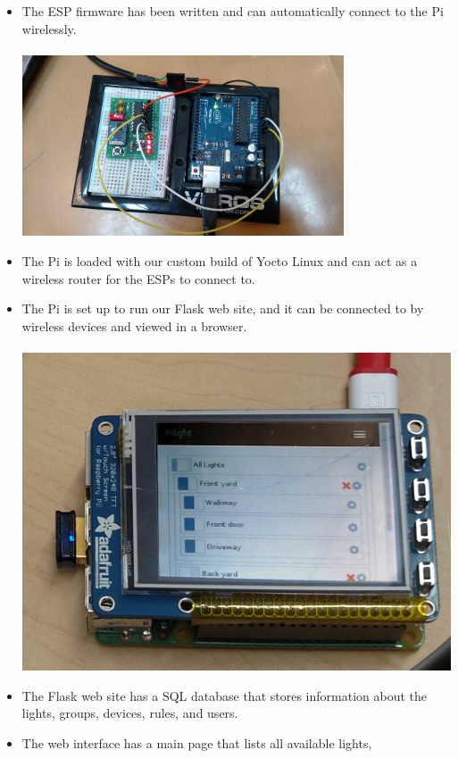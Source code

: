 \documentclass[10pt,draftclsnofoot,onecolumn]{IEEEtran}
\begin{document}
\begin{itemize}
    \item The ESP firmware has been written and can automatically connect to
        the Pi wirelessly. \\ \\
      \includegraphics[width=0.75\textwidth]{pi-esp.png}
    \item The Pi is loaded with our custom build of Yocto Linux and can act as
        a wireless router for the ESPs to connect to.
    \item The Pi is set up to run our Flask web site, and it can be connected
        to by wireless devices and viewed in a browser. \\ \\
      \includegraphics[width=1.0\textwidth]{pi-screen.png}
    \item The Flask web site has a SQL database that stores information about
        the lights, groups, devices, rules, and users.
    \item The web interface has a main page that lists all available lights,

\end{itemize}
\end{document}
